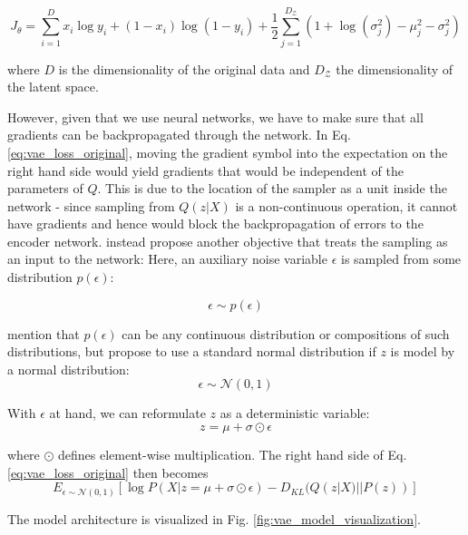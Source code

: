 \documentclass[6pt]{article}
\begin{document}
\begin{equation}
J_\theta = \sum_{i=1}^{D} x_i \log y_i + (1-x_i) \log (1-y_i) + \frac{1}{2}\sum_{j=1}^{D_{\mathcal{Z}}}(1+\log(\sigma_j^2)-\mu_j^2-\sigma_j^2)
\end{equation}

where $D$ is the dimensionality of the original data and $D_{\mathcal{Z}}$ the dimensionality of the latent space.

However, given that we use neural networks, we have to make sure that all gradients can be backpropagated through the network. In Eq. \ref{eq:vae_loss_original}, moving the gradient symbol into the expectation on the right hand side would yield gradients that would be independent of the parameters of $Q$. This is due to the location of the sampler as a unit inside the network - since sampling from $Q(z|X)$ is a non-continuous operation, it cannot have gradients and hence would block the backpropagation of errors to the encoder network. \cite{kingma2013auto} instead propose another objective that treats the sampling as an input to the network: Here, an auxiliary noise variable $\epsilon$ is sampled from some distribution $p(\epsilon)$:

\begin{equation}
\epsilon \sim p(\epsilon)
\end{equation}

\cite{kingma2013auto} mention that  $p(\epsilon)$ can be any continuous distribution or compositions of such distributions, but propose to use a standard normal distribution if $z$ is model by a normal distribution:
\begin{equation}
\epsilon \sim \mathcal{N}(0,1)
\end{equation}

With $\epsilon$ at hand, we can reformulate $z$ as a deterministic variable:
\begin{equation}
z = \mu + \sigma \odot \epsilon
\end{equation}

where $\odot$ defines element-wise multiplication.
The right hand side of Eq. \ref{eq:vae_loss_original} then becomes
\begin{equation}
\label{eq:vae_loss_reparameterized}
E_{\epsilon \sim \mathcal{N}(0,1)}[\log P(X|z= \mu + \sigma \odot \epsilon) - D_{KL}(Q(z|X)||P(z))] 
\end{equation}

The model architecture is visualized in Fig. \ref{fig:vae_model_visualization}. 
\end{document}
